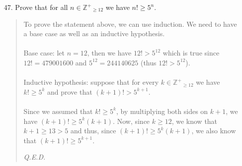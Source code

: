 \documentclass[12pt, a4paper]{article}                      %
\newcommand{\intzp}{\mathbb{Z^+}}
\begin{document}
\begin{itemize}
\item[47.]
Prove that for all $n \in \intzp_{\geq 12}$ we have $n! \geq 5^n$.
\begin{quote}
To prove the statement above, we can use induction. We need to have a base case as well as an inductive hypothesis.\\\\
Base case: let $n = 12$, then we have $12! > 5^{12}$ which is true since $12! = 479001600$ and $5^{12} = 244140625$ (thus $12! > 5^{12}$).\\\\
Inductive hypothesis: suppose that for every $k \in \intzp_{\geq 12}$ we have $k! \geq 5^k$ and prove that $(k + 1)! > 5^{k + 1}$.\\\\
Since we assumed that $k! \geq 5^k$, by multiplying both sides on $k + 1$, we have $(k + 1)! \geq 5^k (k + 1)$.
Now, since $k \geq 12$, we know that $k + 1 \geq 13 > 5$ and thus, since $(k + 1)! \geq 5^k (k + 1)$, we also know that
$(k + 1)! \geq 5^{k + 1}$.
\begin{flushright}
\textit{Q.E.D.}
\end{flushright}
\end{quote}

\item[]


\end{itemize}
\end{document}

